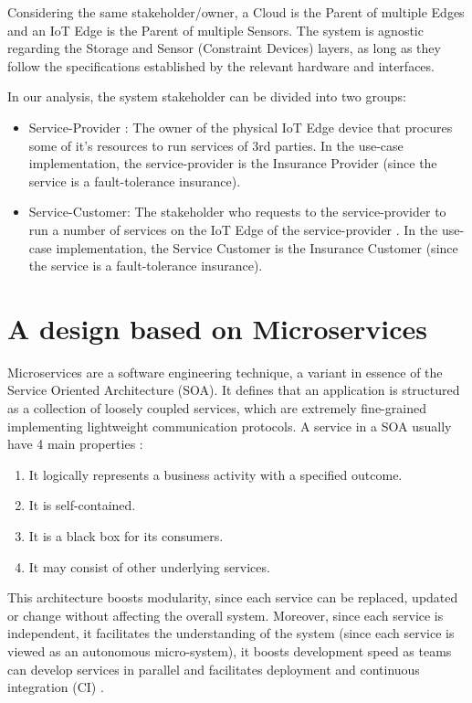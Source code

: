 Considering the same stakeholder/owner, a Cloud is the Parent of multiple Edges and an IoT Edge is the Parent of multiple Sensors. The system is agnostic regarding the Storage and Sensor (Constraint Devices)  layers, as long as they follow the specifications established by the relevant hardware and interfaces. 

In our analysis, the system stakeholder can be divided into two groups:
\begin{itemize}
    \item Service-Provider : The owner of the physical IoT Edge device that procures some of it’s resources to run services of 3rd parties. In the use-case implementation, the service-provider  is the Insurance Provider (since the service is a fault-tolerance insurance).
    \item Service-Customer: The stakeholder who requests to the service-provider  to run a number of services on the IoT Edge of the service-provider . In the use-case implementation, the Service Customer is the Insurance Customer (since the service is a fault-tolerance insurance).
\end{itemize}



\section{A design based on Microservices}

Microservices are a software engineering technique, a variant in essence of the Service Oriented Architecture (SOA). It defines that an application is structured as a collection of loosely coupled services\cite{8354433}, which are extremely fine-grained implementing lightweight communication protocols. A service in a SOA usually have 4 main properties \cite{service-oriented-architecture}:
\begin{enumerate}
    \item It logically represents a business activity with a specified outcome.
    \item It is self-contained.
    \item It is a black box for its consumers.
    \item It may consist of other underlying services.
\end{enumerate}

This architecture boosts modularity, since each service can be replaced, updated or change without affecting the overall system. Moreover, since each service is independent, it facilitates the understanding of the system (since each service is viewed as an autonomous micro-system), it boosts development speed as teams can develop services in parallel and facilitates deployment and continuous integration (CI) \cite{microservices.io}.


